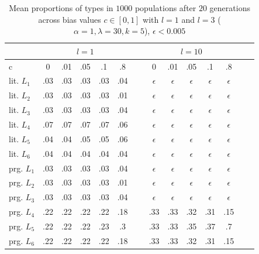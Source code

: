 \documentclass[a4paper]{article}
\begin{document}
\begin{table}
\centering 
\begin{tabular}{l | c c c c c| c c c c c c c c}
\multicolumn{1}{c}{~} & \multicolumn{5}{c}{$l = 1$} & ~ & \multicolumn{5}{c}{$l = 10$}\\ \hline \hline
c  & 0 & .01 & .05 & .1 & .8 & ~ & 0 & .01 & .05 & .1 & .8\\ \hline \hline
lit. $L_1$& .03 & .03 & .03 & .03  & .04 & ~ & $\epsilon$ & $\epsilon$ & $\epsilon$ & $\epsilon$ & $\epsilon$\\ 
lit. $L_2$ & .03 & .03 & .03 & .03 & .01 & ~ & $\epsilon$& $\epsilon$ & $\epsilon$ & $\epsilon$ & $\epsilon$\\
lit. $L_3$ & .03 & .03 & .03 & .03 & .04 & ~ & $\epsilon$& $\epsilon$ & $\epsilon$ & $\epsilon$ & $\epsilon$\\
lit. $L_4$ & .07 & .07 & .07 & .07 & .06 & ~ & $\epsilon$& $\epsilon$ & $\epsilon$ & $\epsilon$ & $\epsilon$\\
lit. $L_5$ & .04 & .04 & .05 & .05 & .06& ~ & $\epsilon$& $\epsilon$ & $\epsilon$ & $\epsilon$ & $\epsilon$\\
lit. $L_6$ & .04 & .04 & .04 & .04 & .04& ~ & $\epsilon$& $\epsilon$ & $\epsilon$ & $\epsilon$ & $\epsilon$\\ \hline
prg. $L_1$ & .03 & .03 & .03 & .03 & .04& ~ & $\epsilon$& $\epsilon$ & $\epsilon$ & $\epsilon$ & $\epsilon$ \\
prg. $L_2$ & .03 & .03 & .03 & .03 & .01& ~ & $\epsilon$& $\epsilon$ & $\epsilon$ & $\epsilon$ & $\epsilon$ \\
prg. $L_3$ & .03 & .03 & .03 & .03 & .04& ~ & $\epsilon$& $\epsilon$ & $\epsilon$ & $\epsilon$ & $\epsilon$ \\ 
prg. $L_4$ & .22 & .22 & .22 & .22 & .18& ~ & .33& .33 & .32 & .31 & .15 \\
prg. $L_5$ & .22 & .22 & .22 & .23 & .3& ~ & .33& .33 & .35 & .37 & .7 \\
prg. $L_6$ & .22 & .22 & .22 & .22 & .18& ~ & .33& .33 & .32 & .31 & .15   
\end{tabular}
\caption{Mean proportions of types in $1000$ populations after $20$ generations across bias values $c \in [0,1]$ with $l =1$ and $l = 3$ ($\alpha = 1, \lambda = 30, k = 5$), $\epsilon < 0.005$}
\label{tab:numeric-results}
\end{table}
\end{document}
